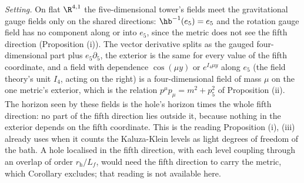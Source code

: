 \emph{Setting.} On flat $\R^{4,1}$ the five-dimensional tower's fields meet the gravitational gauge fields only on the shared directions: $\hb^{-1}(e_{5}) = e_{5}$ and the rotation gauge field has no component along or into $e_{5}$, since the metric does not see the fifth direction (Proposition (i)). The vector derivative splits as the gauged four-dimensional part plus $e_{5}\partial_{5}$, the exterior is the same for every value of the fifth coordinate, and a field with dependence $\cos(\mu y)$ or $e^{I_4\mu y}$ along $e_{5}$ (the field theory's unit $I_4$, acting on the right) is a four-dimensional field of mass $\mu$ on the one metric's exterior, which is the relation $p^{\mu}p_{\mu} = m^{2} + p_{5}^{2}$ of Proposition (ii). The horizon seen by these fields is the hole's horizon times the whole fifth direction: no part of the fifth direction lies outside it, because nothing in the exterior depends on the fifth coordinate. This is the reading Proposition (i), (iii) already uses when it counts the Kaluza-Klein levels as light degrees of freedom of the bath. A hole localised in the fifth direction, with each level coupling through an overlap of order $r_{\mathrm{h}}/L_{f}$, would need the fifth direction to carry the metric, which Corollary  excludes; that reading is not available here.

